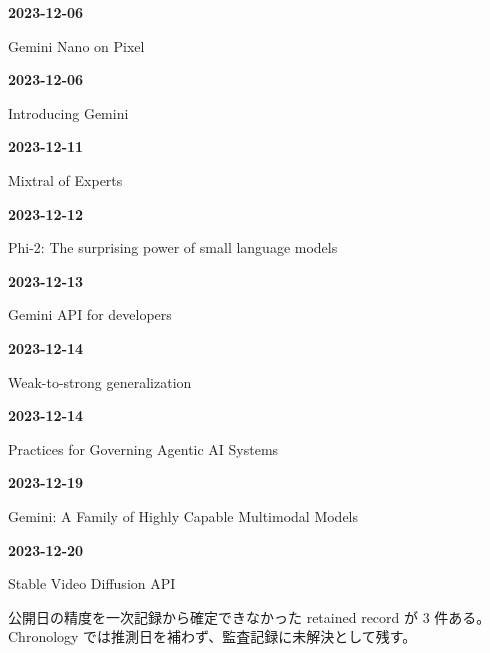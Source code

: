 \smallskip
\noindent\textbf{2023-12-06}\par
{\raggedright Gemini Nano on Pixel\par}
\smallskip
\noindent\textbf{2023-12-06}\par
{\raggedright Introducing Gemini\par}
\smallskip
\noindent\textbf{2023-12-11}\par
{\raggedright Mixtral of Experts\par}
\smallskip
\noindent\textbf{2023-12-12}\par
{\raggedright Phi-2: The surprising power of small language models\par}
\smallskip
\noindent\textbf{2023-12-13}\par
{\raggedright Gemini API for developers\par}
\smallskip
\noindent\textbf{2023-12-14}\par
{\raggedright Weak-to-strong generalization\par}
\smallskip
\noindent\textbf{2023-12-14}\par
{\raggedright Practices for Governing Agentic AI Systems\par}
\smallskip
\noindent\textbf{2023-12-19}\par
{\raggedright Gemini: A Family of Highly Capable Multimodal Models\par}
\smallskip
\noindent\textbf{2023-12-20}\par
{\raggedright Stable Video Diffusion API\par}
\smallskip
\medskip
\begin{claimboundary}[日付精度の境界]
公開日の精度を一次記録から確定できなかった retained record が 3 件ある。Chronology では推測日を補わず、監査記録に未解決として残す。
\end{claimboundary}

